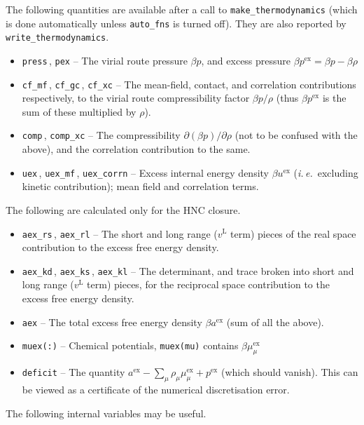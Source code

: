 \documentclass[12pt,a4paper]{article}
\newcommand{\latin}[1]{\emph{#1}}
\newcommand{\ie}{\latin{i.\,e.}}
\newcommand{\myex}{^{\mathrm{ex}}}
\newcommand{\pex}{p\myex}
\newcommand{\uex}{u\myex}
\newcommand{\aex}{a\myex}
\newcommand{\muex}{\mu\myex}
\newcommand{\lr}{^{\mathrm{L}}}
\begin{document}
%
The following quantities are available after a call to
\verb+make_thermodynamics+ (which is done automatically unless
\verb+auto_fns+ is turned off).  They are also reported by
\verb+write_thermodynamics+.
%
\begin{itemize}
%
\item\verb+press+\,, \verb+pex+ -- The virial route pressure $\beta p$,
  and excess pressure $\beta \pex=\beta p-\beta\rho$
%
\item\verb+cf_mf+\,, \verb+cf_gc+\,, \verb+cf_xc+ -- The mean-field,
  contact, and correlation contributions respectively, to the virial
  route compressibility factor $\beta p/\rho$ (thus $\beta\pex$ is the sum
  of these multiplied by $\rho$).
%
\item\verb+comp+\,, \verb+comp_xc+ -- The compressibility
  $\partial(\beta p)/\partial\rho$ (not to be confused with the
  above), and the correlation contribution to the same.
%
\item\verb+uex+\,, \verb+uex_mf+\,, \verb+uex_corrn+ -- Excess internal energy
  density $\beta\uex$ (\ie\ excluding kinetic contribution); mean
  field and correlation terms.
%
\end{itemize}
%
The following are calculated only for the HNC closure.
\begin{itemize}
%
\item\verb+aex_rs+\,, \verb+aex_rl+ -- The short and long range
  ($v\lr$ term) pieces of the real space contribution to the excess
  free energy density.
%
\item\verb+aex_kd+\,, \verb+aex_ks+\,, \verb+aex_kl+ -- The
  determinant, and trace broken into short and long range ($v\lr$
  term) pieces, for the reciprocal space contribution to the excess
  free energy density.
%
\item\verb+aex+ -- The total excess free energy density
  $\beta\aex$ (sum of all the above).
%
\item\verb+muex(:)+ -- Chemical potentials, \verb+muex(mu)+ contains
  $\beta\muex_\mu$
%
\item\verb+deficit+ -- The quantity $\aex - \sum_{\mu}\rho_\mu
  \muex_\mu + \pex$ (which should vanish).  This can be viewed as a
  certificate of the numerical discretisation error.
%
\end{itemize}
%
The following internal variables may be useful.
%
\end{document}
